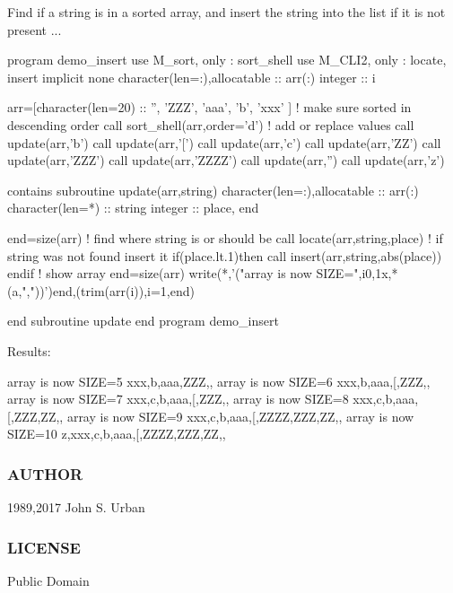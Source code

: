 Find if a string is in a sorted array, and insert the string into the list if it is not present ... \begin{DoxyVerb}program demo_insert
use M_sort, only : sort_shell
use M_CLI2, only : locate, insert
implicit none
character(len=:),allocatable :: arr(:)
integer                       :: i

arr=[character(len=20) :: '', 'ZZZ', 'aaa', 'b', 'xxx' ]
! make sure sorted in descending order
call sort_shell(arr,order='d')
! add or replace values
call update(arr,'b')
call update(arr,'[')
call update(arr,'c')
call update(arr,'ZZ')
call update(arr,'ZZZ')
call update(arr,'ZZZZ')
call update(arr,'')
call update(arr,'z')

contains
subroutine update(arr,string)
character(len=:),allocatable :: arr(:)
character(len=*)             :: string
integer                      :: place, end

end=size(arr)
! find where string is or should be
call locate(arr,string,place)
! if string was not found insert it
if(place.lt.1)then
   call insert(arr,string,abs(place))
endif
! show array
end=size(arr)
write(*,'("array is now SIZE=",i0,1x,*(a,","))')end,(trim(arr(i)),i=1,end)

end subroutine update
end program demo_insert
\end{DoxyVerb}


Results\+:

array is now S\+I\+ZE=5 xxx,b,aaa,Z\+ZZ,, array is now S\+I\+ZE=6 xxx,b,aaa,\mbox{[},Z\+ZZ,, array is now S\+I\+ZE=7 xxx,c,b,aaa,\mbox{[},Z\+ZZ,, array is now S\+I\+ZE=8 xxx,c,b,aaa,\mbox{[},Z\+ZZ,ZZ,, array is now S\+I\+ZE=9 xxx,c,b,aaa,\mbox{[},Z\+Z\+ZZ,Z\+ZZ,ZZ,, array is now S\+I\+ZE=10 z,xxx,c,b,aaa,\mbox{[},Z\+Z\+ZZ,Z\+ZZ,ZZ,,

\subsubsection*{A\+U\+T\+H\+OR}

1989,2017 John S. Urban \subsubsection*{L\+I\+C\+E\+N\+SE}

Public Domain \mbox{\label{interfacem__cli2_1_1insert_a50fcaf89ea5907952b521845dd434835}} 
